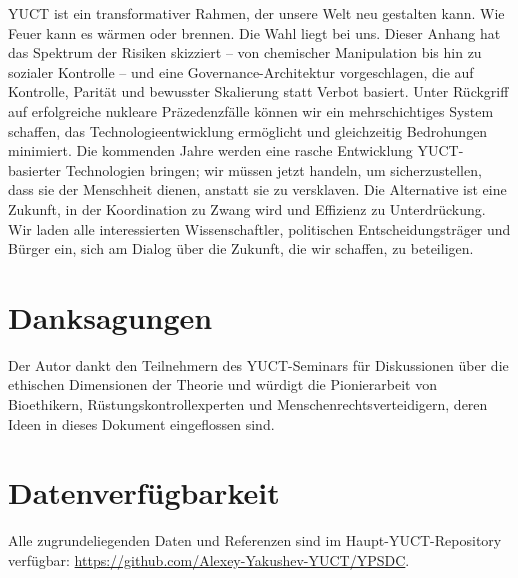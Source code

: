 \documentclass[12pt,a4paper]{article}
\theoremstyle{remark}
\begin{document}
	YUCT ist ein transformativer Rahmen, der unsere Welt neu gestalten kann. Wie Feuer kann es wärmen oder brennen. Die Wahl liegt bei uns. Dieser Anhang hat das Spektrum der Risiken skizziert – von chemischer Manipulation bis hin zu sozialer Kontrolle – und eine Governance-Architektur vorgeschlagen, die auf Kontrolle, Parität und bewusster Skalierung statt Verbot basiert. Unter Rückgriff auf erfolgreiche nukleare Präzedenzfälle können wir ein mehrschichtiges System schaffen, das Technologieentwicklung ermöglicht und gleichzeitig Bedrohungen minimiert. Die kommenden Jahre werden eine rasche Entwicklung YUCT-basierter Technologien bringen; wir müssen jetzt handeln, um sicherzustellen, dass sie der Menschheit dienen, anstatt sie zu versklaven. Die Alternative ist eine Zukunft, in der Koordination zu Zwang wird und Effizienz zu Unterdrückung. Wir laden alle interessierten Wissenschaftler, politischen Entscheidungsträger und Bürger ein, sich am Dialog über die Zukunft, die wir schaffen, zu beteiligen.
	
	\section*{Danksagungen}
	Der Autor dankt den Teilnehmern des YUCT-Seminars für Diskussionen über die ethischen Dimensionen der Theorie und würdigt die Pionierarbeit von Bioethikern, Rüstungskontrollexperten und Menschenrechtsverteidigern, deren Ideen in dieses Dokument eingeflossen sind.
	
	\section*{Datenverfügbarkeit}
	Alle zugrundeliegenden Daten und Referenzen sind im Haupt-YUCT-Repository verfügbar: \url{https://github.com/Alexey-Yakushev-YUCT/YPSDC}.
	
\end{document}
